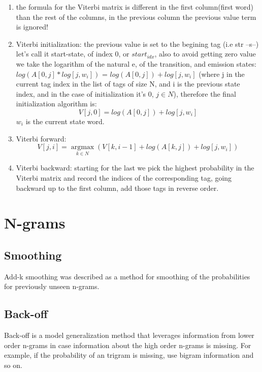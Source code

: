 \documentclass[4apaper,12pt]{book}
\begin{document}
\begin{description}
\begin{enumerate}
    \item the formula for the Viterbi matrix is different in the first column(first word) than the rest of the columns, in the previous column the previous value term is ignored!

    \item Viterbi initialization: the previous value is set to the begining tag (i.e str --s--) let's call it start-state, of index 0, or $start_{idx}$, also to avoid getting zero value we take the logarithm of the natural e, of the transition, and emission states: $log(A[0,j]*log[j,w_i])$ = $log(A[0,j]) + log[j,w_i]$ (where j in the current tag index in the list of tags of size N, and i is the previous state index, and in the case of initialization it's 0,  $j \in N$), therefore the final initialization algorithm is:  $$V[j,0] = log(A[0,j]) + log[j,w_i]$$ $w_i$ is the current state word.

    \item Viterbi forward: $$V[j,i] = \underset{k \in N}{\operatorname{argmax}}(V[k, i-1] + log(A[k,j]) + log[j,w_i])$$

    \item Viterbi backward: starting for the last we pick the highest probability in the Viterbi matrix and record the indices of the corresponding tag, going backward up to the first column, add those tags in reverse order.
    \end{enumerate}


    \section {N-grams}
    \subsection{Smoothing}
    \begin{description}
      \item Add-k smoothing was described as a method for smoothing of the probabilities for previously unseen n-grams.
      \end{description}
    \subsection{Back-off}
    \begin{description}
    \item Back-off is a model generalization method that leverages information from lower order n-grams in case information about the high order n-grams is missing. For example, if the probability of an trigram is missing, use bigram information and so on.
    \end{description}

\end{description}
\end{document}
